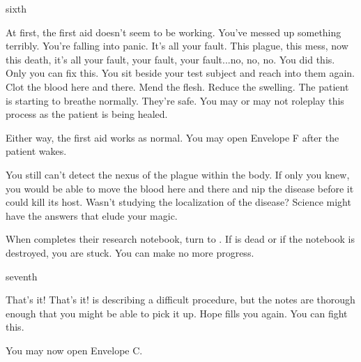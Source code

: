 \documentclass[greennotebook]{Pestilence} %
\begin{document}
\begin{page}{sixth}

At first, the first aid doesn't seem to be working. You've messed up something terribly. You're falling into panic. It's all your fault. This plague, this mess, now this death, it's all your fault, your fault, your fault...no, no, no. You did this. Only you can fix this. You sit beside your test subject and reach into them again. Clot the blood here and there. Mend the flesh. Reduce the swelling. The patient is starting to breathe normally. They're safe. You may or may not roleplay this process as the patient is being healed. 

Either way, the first aid works as normal. You may open Envelope F after the patient wakes. 

You still can't detect the nexus of the plague within the body. If only you knew, you would be able to move the blood here and there and nip the disease before it could kill its host. Wasn't \cOutsider{} studying the localization of the disease? Science might have the answers that elude your magic.

When \cOutsider{} completes their research notebook, turn to . If \cOutsider{} is dead or if the notebook is destroyed, you are stuck. You can make no more progress.

\end{page}

\begin{page}{seventh}

That's it! That's it! \cOutsider{\They} is describing a difficult procedure, but the notes are thorough enough that you might be able to pick it up. Hope fills you again. You can fight this.

You may now open Envelope C.

\end{page}

\endnotebook
\end{document}
